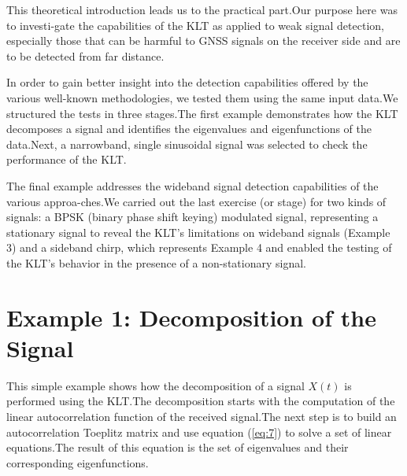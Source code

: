 \documentclass[12pt]{report}
\begin{document}
This theoretical introduction leads us to the practical part.\@ Our purpose here was to investi-gate the capabilities of the KLT as applied to weak signal detection, especially those that can be harmful to GNSS signals on the receiver side and are to be detected from far distance.

In order to gain better insight into the detection capabilities offered by the various well-known methodologies, we tested them using the same input data.\@ We structured the tests in three stages.\@ The first example demonstrates how the KLT decomposes a signal and identifies the eigenvalues and eigenfunctions of the data.\@ Next, a narrowband, single sinusoidal signal was selected to check the performance of the KLT.

The final example addresses the wideband signal detection capabilities of the various approa-ches.\@ We carried out the last exercise (or stage) for two kinds of signals: a BPSK (binary phase shift keying) modulated signal, representing a stationary signal to reveal the KLT's limitations on wideband signals (Example 3) and a  sideband chirp, which represents Example 4 and enabled the testing of the KLT's behavior in the presence of a non-stationary signal.
\section*{Example 1: Decomposition of the Signal}
This simple example shows how the decomposition of a signal $X(t)$ is performed using the KLT.\@ The decomposition starts with the computation of the linear autocorrelation function of the received signal.\@ The next step is to build an autocorrelation Toeplitz matrix and use equation (\ref{eq:7}) to solve a set of linear equations.\@ The result of this equation is the set of eigenvalues and their corresponding eigenfunctions.
\end{document}
